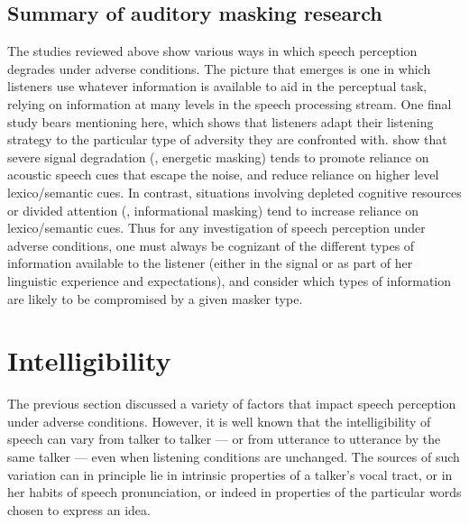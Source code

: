 \subsection{Summary of auditory masking research}
The studies reviewed above show various ways in which speech perception degrades under adverse conditions.  The picture that emerges is one in which listeners use whatever information is available to aid in the perceptual task, relying on information at many levels in the speech processing stream.  One final study bears mentioning here, which shows that listeners adapt their listening strategy to the particular type of adversity they are confronted with.  \citet{MattysEtAl2009} show that severe signal degradation (\ie, energetic masking) tends to promote reliance on acoustic speech cues that escape the noise, and reduce reliance on higher level lexico\-/semantic cues.  In contrast, situations involving depleted cognitive resources or divided attention (\ie, informational masking) tend to increase reliance on lexico\-/semantic cues.  Thus for any investigation of speech perception under adverse conditions, one must always be cognizant of the different types of information available to the listener (either in the signal or as part of her linguistic experience and expectations), and consider which types of information are likely to be compromised by a given masker type. 

\section{Intelligibility}
The previous section discussed a variety of factors that impact speech perception under adverse conditions.  However, it is well known that the intelligibility of speech can vary from talker to talker — or from utterance to utterance by the same talker — even when listening conditions are unchanged.  The sources of such variation can in principle lie in intrinsic properties of a talker’s vocal tract, or in her habits of speech pronunciation, or indeed in properties of the particular words chosen to express an idea.  

